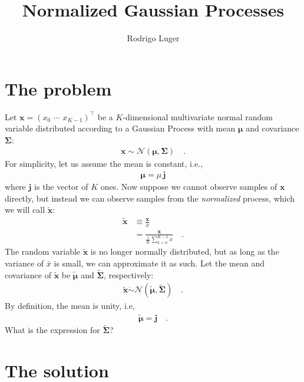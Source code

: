 \documentclass[modern]{aastex62}
\begin{document}
\title{%
    \textbf{
        Normalized Gaussian Processes
    }
}

\author{Rodrigo Luger}

\section{The problem}

Let $\mathbf{x} = \left( x_0 \,\, \cdots \,\, x_{K-1} \right)^\top$
be a $K$-dimensional multivariate normal random variable distributed
according to a Gaussian Process with mean $\pmb{\mu}$
and covariance $\pmb{\Sigma}$:
%
\begin{align}
    \mathbf{x} \sim \mathcal{N}\left( \pmb{\mu}, \pmb{\Sigma} \right)
    \quad.
\end{align}
%
For simplicity, let us assume the mean is constant, i.e.,
%
\begin{align}
    \pmb{\mu} = \mu \, \mathbf{j}
\end{align}
%
where $\mathbf{j}$ is the vector of $K$ ones.
%
Now suppose we cannot observe samples of $\mathbf{x}$ directly, but instead we can
observe samples from the \emph{normalized} process, which we will call
$\tilde{\mathbf{x}}$:
%
\begin{align}
    \tilde{\mathbf{x}}
     & \equiv \frac{\mathbf{x}}{\bar{x}}
    \nonumber                                                    \\[0.5em]
     & = \frac{\mathbf{x}}{\frac{1}{K}\sum\limits_{k=0}^{K-1} x}
    \quad.
\end{align}
%
The random variable $\tilde{\mathbf{x}}$ is no longer normally distributed, but as long as
the variance of $\bar{x}$ is small, we can approximate it as such. Let the mean
and covariance of $\tilde{\mathbf{x}}$ be $\tilde{\pmb{\mu}}$ and $\tilde{\pmb{\Sigma}}$, respectively:
%
\begin{align}
    \tilde{\mathbf{x}} \mathrel{\dot\sim} \mathcal{N}\left( \tilde{\pmb{\mu}}, \tilde{\pmb{\Sigma}} \right)
    \quad.
\end{align}
%
By definition, the mean is unity, i.e,
%
\begin{align}
    \tilde{\pmb{\mu}} = \mathbf{j}
    \quad.
\end{align}
%
What is the expression for $\tilde{\pmb{\Sigma}}$?

\section{The solution}
\end{document}
